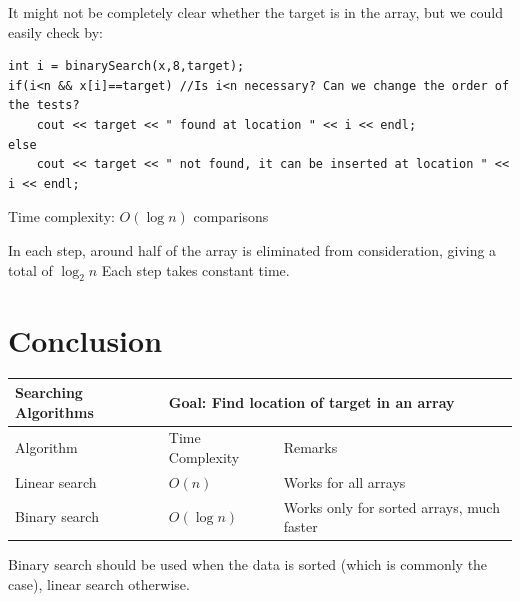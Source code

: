 It might not be completely clear whether the target is in the array, but we could easily check by:

\begin{lstlisting}
int i = binarySearch(x,8,target);
if(i<n && x[i]==target) //Is i<n necessary? Can we change the order of the tests?
    cout << target << " found at location " << i << endl;
else 
    cout << target << " not found, it can be inserted at location " << i << endl;
\end{lstlisting}

Time complexity: $O(\log n)$ comparisons
\vspace{6mm}

In each step, around half of the array is eliminated from consideration, giving a total of $\log_2 n$ Each step takes constant time.

\section{Conclusion}

\begin{table}[h]
    \centering
    \begin{tabular}{|m{6em}|m{9em}|m{18em}|}
        \hline  
        \textbf{Searching Algorithms} & 
        \multicolumn{2}{l|}{Goal: Find location of target in an array}
        \\ \hline \hline
        
        Algorithm &
        Time Complexity & 
        Remarks
        \\ \hline \hline
        
        Linear search &
        $O(n)$ &
        Works for all arrays
        \\ \hline
        
        Binary search &
        $O(\log n)$ &
        Works only for sorted arrays, much faster
        \\ \hline
    \end{tabular}
\end{table}

Binary search should be used when the data is sorted (which is commonly the case), linear search otherwise.